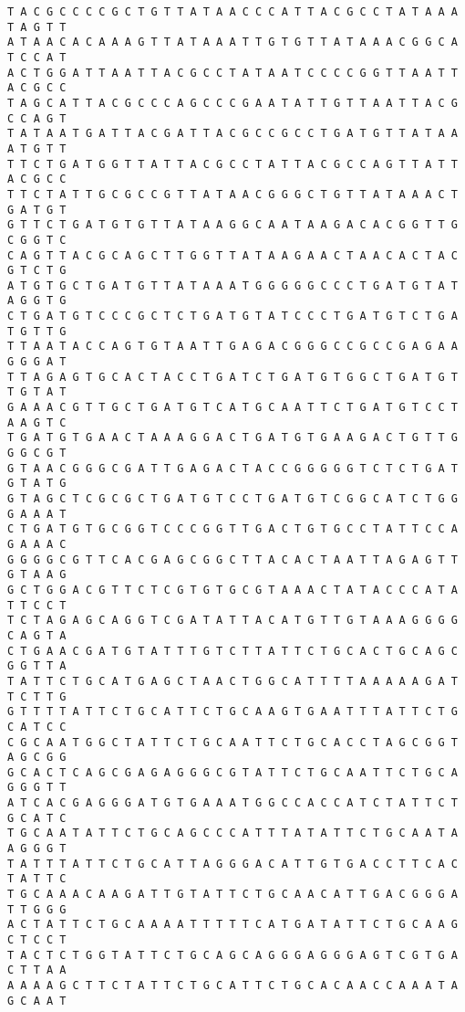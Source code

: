 \documentclass[11pt]{article}
\begin{document}
\begin{Verbatim}[commandchars=\\\{\}]
T A C G C C C C G C T G T T A T A A C C C A T T A C G C C T A T A A A T A G T T
A T A A C A C A A A G T T A T A A A T T G T G T T A T A A A C G G C A T C C A T
A C T G G A T T A A T T A C G C C T A T A A T C C C C G G T T A A T T A C G C C
T A G C A T T A C G C C C A G C C C G A A T A T T G T T A A T T A C G C C A G T
T A T A A T G A T T A C G A T T A C G C C G C C T G A T G T T A T A A A T G T T
T T C T G A T G G T T A T T A C G C C T A T T A C G C C A G T T A T T A C G C C
T T C T A T T G C G C C G T T A T A A C G G G C T G T T A T A A A C T G A T G T
G T T C T G A T G T G T T A T A A G G C A A T A A G A C A C G G T T G C G G T C
C A G T T A C G C A G C T T G G T T A T A A G A A C T A A C A C T A C G T C T G
A T G T G C T G A T G T T A T A A A T G G G G G C C C T G A T G T A T A G G T G
C T G A T G T C C C G C T C T G A T G T A T C C C T G A T G T C T G A T G T T G
T T A A T A C C A G T G T A A T T G A G A C G G G C C G C C G A G A A G G G A T
T T A G A G T G C A C T A C C T G A T C T G A T G T G G C T G A T G T T G T A T
G A A A C G T T G C T G A T G T C A T G C A A T T C T G A T G T C C T A A G T C
T G A T G T G A A C T A A A G G A C T G A T G T G A A G A C T G T T G G G C G T
G T A A C G G G C G A T T G A G A C T A C C G G G G G T C T C T G A T G T A T G
G T A G C T C G C G C T G A T G T C C T G A T G T C G G C A T C T G G G A A A T
C T G A T G T G C G G T C C C G G T T G A C T G T G C C T A T T C C A G A A A C
G G G G C G T T C A C G A G C G G C T T A C A C T A A T T A G A G T T G T A A G
G C T G G A C G T T C T C G T G T G C G T A A A C T A T A C C C A T A T T C C T
T C T A G A G C A G G T C G A T A T T A C A T G T T G T A A A G G G G C A G T A
C T G A A C G A T G T A T T T G T C T T A T T C T G C A C T G C A G C G G T T A
T A T T C T G C A T G A G C T A A C T G G C A T T T T A A A A A G A T T C T T G
G T T T T A T T C T G C A T T C T G C A A G T G A A T T T A T T C T G C A T C C
C G C A A T G G C T A T T C T G C A A T T C T G C A C C T A G C G G T A G C G G
G C A C T C A G C G A G A G G G C G T A T T C T G C A A T T C T G C A G G G T T
A T C A C G A G G G A T G T G A A A T G G C C A C C A T C T A T T C T G C A T C
T G C A A T A T T C T G C A G C C C A T T T A T A T T C T G C A A T A A G G G T
T A T T T A T T C T G C A T T A G G G A C A T T G T G A C C T T C A C T A T T C
T G C A A A C A A G A T T G T A T T C T G C A A C A T T G A C G G G A T T G G G
A C T A T T C T G C A A A A T T T T T C A T G A T A T T C T G C A A G C T C C T
T A C T C T G G T A T T C T G C A G C A G G G A G G G A G T C G T G A C T T A A
A A A A G C T T C T A T T C T G C A T T C T G C A C A A C C A A A T A G C A A T

\end{Verbatim}
\end{document}
